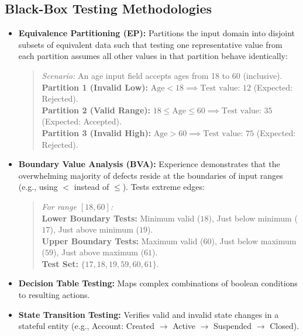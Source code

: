\subsection{Black-Box Testing Methodologies}
\begin{itemize}
    \item \textbf{Equivalence Partitioning (EP):} Partitions the input domain into disjoint subsets of equivalent data such that testing one representative value from each partition assumes all other values in that partition behave identically:
    \begin{quote}
    \textit{Scenario:} An age input field accepts ages from 18 to 60 (inclusive). \\
    \textbf{Partition 1 (Invalid Low):} $\text{Age} < 18 \implies \text{Test value: } 12$ (Expected: Rejected). \\
    \textbf{Partition 2 (Valid Range):} $18 \le \text{Age} \le 60 \implies \text{Test value: } 35$ (Expected: Accepted). \\
    \textbf{Partition 3 (Invalid High):} $\text{Age} > 60 \implies \text{Test value: } 75$ (Expected: Rejected).
    \end{quote}
    \item \textbf{Boundary Value Analysis (BVA):} Experience demonstrates that the overwhelming majority of defects reside at the boundaries of input ranges (e.g., using $<$ instead of $\le$). Tests extreme edges:
    \begin{quote}
    \textit{For range $[18, 60]$:} \\
    \textbf{Lower Boundary Tests:} Minimum valid ($18$), Just below minimum ($17$), Just above minimum ($19$). \\
    \textbf{Upper Boundary Tests:} Maximum valid ($60$), Just below maximum ($59$), Just above maximum ($61$). \\
    \textbf{Test Set:} $\{17, 18, 19, 59, 60, 61\}$.
    \end{quote}
    \item \textbf{Decision Table Testing:} Maps complex combinations of boolean conditions to resulting actions.
    \item \textbf{State Transition Testing:} Verifies valid and invalid state changes in a stateful entity (e.g., Account: Created $\to$ Active $\to$ Suspended $\to$ Closed).
\end{itemize}

